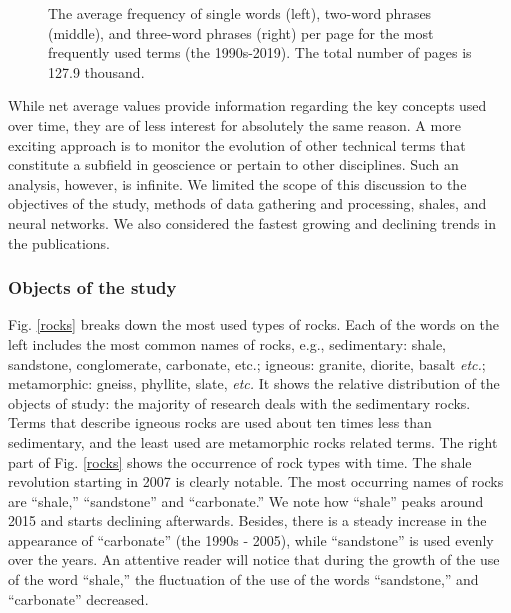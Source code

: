 \documentclass[geosciences,article,submit,moreauthors,pdftex]{Definitions/mdpi}
\begin{document}
\begin{figure}[ht!]
\caption{The average frequency of single words (left), two-word phrases (middle), and three-word phrases (right) per page for the most frequently used terms (the 1990s-2019). The total number of pages is 127.9 thousand.}
\label{grams}
\end{figure}

While net average values provide information regarding the key concepts used over time, they are of less interest for absolutely the same reason. A more exciting approach is to monitor the evolution of other technical terms that constitute a subfield in geoscience or pertain to other disciplines. Such an analysis, however, is infinite. We limited the scope of this discussion to the objectives of the study, methods of data gathering and processing, shales, and neural networks. We also considered the fastest growing and declining trends in the publications.

\subsubsection{Objects of the study}
Fig. \ref{rocks} breaks down the most used types of rocks. Each of the words on the left includes the most common names of rocks, e.g., sedimentary: shale, sandstone, conglomerate, carbonate, etc.; igneous: granite, diorite, basalt \textit{etc.}; metamorphic: gneiss, phyllite, slate, \textit{etc.} It shows the relative distribution of the objects of study: the majority of research deals with the sedimentary rocks. Terms that describe igneous rocks are used about ten times less than sedimentary, and the least used are metamorphic rocks related terms. The right part of Fig. \ref{rocks} shows the occurrence of rock types with time. The shale revolution starting in 2007 is clearly notable. The most occurring names of rocks are ``shale,'' ``sandstone'' and ``carbonate.'' We note how ``shale'' peaks around 2015 and starts declining afterwards. Besides, there is a steady increase in the appearance of ``carbonate'' (the 1990s - 2005), while ``sandstone'' is used evenly over the years. An attentive reader will notice that during the growth of the use of the word ``shale,'' the fluctuation of the use of the words ``sandstone,'' and ``carbonate'' decreased.
\end{document}
